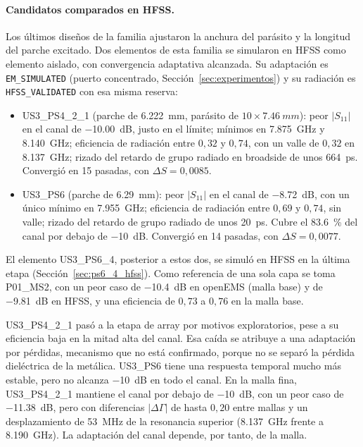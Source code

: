 \documentclass[11pt,a4paper]{article}
\begin{document}
\paragraph{Candidatos comparados en HFSS.} Los últimos diseños de la familia ajustaron la anchura del parásito y la longitud del
parche excitado. Dos elementos de esta familia se simularon en HFSS como elemento aislado, con convergencia adaptativa alcanzada. Su adaptación es \texttt{EM\_SIMULATED} (puerto concentrado, Sección~\ref{sec:experimentos}) y su radiación es \texttt{HFSS\_VALIDATED} con esa misma reserva:
\begin{itemize}
    \item US3\_PS4\_2\_1 (parche de \SI{6.222}{mm}, parásito de $10 \times \SI{7.46}{mm}$): peor $|S_{11}|$ en el
    canal de \SI{-10.00}{dB}, justo en el límite; mínimos en \SI{7.875}{GHz} y \SI{8.140}{GHz}; eficiencia de
    radiación entre $0{,}32$ y $0{,}74$, con un valle de $0{,}32$ en \SI{8.137}{GHz}; rizado del retardo de grupo
    radiado en broadside de unos \SI{664}{ps}. Convergió en 15 pasadas, con $\Delta S = 0{,}0085$.
    \item US3\_PS6 (parche de \SI{6.29}{mm}): peor $|S_{11}|$ en el canal de \SI{-8.72}{dB}, con un único mínimo en
    \SI{7.955}{GHz}; eficiencia de radiación entre $0{,}69$ y $0{,}74$, sin valle; rizado del retardo de grupo
    radiado de unos \SI{20}{ps}. Cubre el \SI{83.6}{\%} del canal por debajo de \SI{-10}{dB}. Convergió en 14
    pasadas, con $\Delta S = 0{,}0077$.
\end{itemize}
El elemento US3\_PS6\_4, posterior a estos dos, se simuló en HFSS en la última etapa (Sección~\ref{sec:ps6_4_hfss}).
Como referencia de una sola capa se toma P01\_MS2, con un peor caso de \SI{-10.4}{dB} en openEMS (malla base) y de \SI{-9.81}{dB} en HFSS, y una eficiencia
de $0{,}73$ a $0{,}76$ en la malla base.

US3\_PS4\_2\_1 pasó a la etapa de array por motivos exploratorios, pese a su eficiencia baja en la mitad alta del canal.
Esa caída se atribuye a una adaptación por pérdidas, mecanismo que no está confirmado, porque no se separó la
pérdida dieléctrica de la metálica. US3\_PS6 tiene una respuesta temporal mucho más estable, pero no alcanza
\SI{-10}{dB} en todo el canal. En la malla fina, US3\_PS4\_2\_1 mantiene el canal por debajo de
\SI{-10}{dB}, con un peor caso de \SI{-11.38}{dB}, pero con diferencias $|\Delta\Gamma|$ de hasta $0{,}20$ entre
mallas y un desplazamiento de \SI{53}{MHz} de la resonancia superior (\SI{8.137}{GHz} frente a \SI{8.190}{GHz}).
La adaptación del canal depende, por tanto, de la malla.
\end{document}
